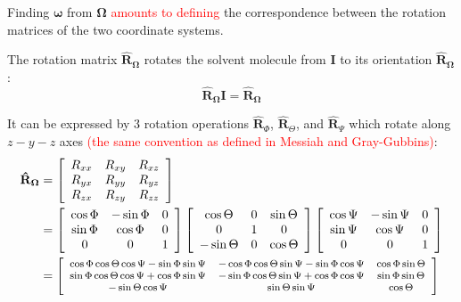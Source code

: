 %
Finding $\boldsymbol{\omega}$ from $\mathbf{\Omega}$ \textcolor{red}{amounts
to defining} the correspondence between the rotation matrices of the
two coordinate systems. 

The rotation matrix $\mathbf{\hat{R}}_{\mathbf{\Omega}}$ rotates
the solvent molecule from $\mathbf{I}$ to its orientation $\mathbf{\hat{R}}_{\mathbf{\Omega}}$:
\begin{equation}
\mathbf{\hat{R}}_{\mathbf{\Omega}}\mathbf{I}=\mathbf{\hat{R}}_{\mathbf{\Omega}}
\end{equation}

It can be expressed by 3 rotation operations $\mathbf{\hat{R}}_{\Phi}$,
$\mathbf{\hat{R}}_{\Theta}$, and $\mathbf{\hat{R}}_{\Psi}$ which
rotate along $z-y-z$ axes \textcolor{red}{(the same convention as
defined in Messiah and Gray-Gubbins)}:
\begin{align}
\mathbf{\hat{R}}_{\mathbf{\Omega}} & =\left[\begin{array}{ccc}
R_{xx} & R_{xy} & R_{xz}\\
R_{yx} & R_{yy} & R_{yz}\\
R_{zx} & R_{zy} & R_{zz}
\end{array}\right]\\
 & =\left[\begin{array}{ccc}
\cos\Phi & -\sin\Phi & 0\\
\sin\Phi & \cos\Phi & 0\\
0 & 0 & 1
\end{array}\right]\left[\begin{array}{ccc}
\cos\Theta & 0 & \sin\Theta\\
0 & 1 & 0\\
-\sin\Theta & 0 & \cos\Theta
\end{array}\right]\left[\begin{array}{ccc}
\cos\Psi & -\sin\Psi & 0\\
\sin\Psi & \cos\Psi & 0\\
0 & 0 & 1
\end{array}\right]\nonumber \\
 & =\footnotesize\left[\begin{array}{ccc}
\cos\Phi\cos\Theta\cos\Psi-\sin\Phi\sin\Psi & -\cos\Phi\cos\Theta\sin\Psi-\sin\Phi\cos\Psi & \cos\Phi\sin\Theta\\
\sin\Phi\cos\Theta\cos\Psi+\cos\Phi\sin\Psi & -\sin\Phi\cos\Theta\sin\Psi+\cos\Phi\cos\Psi & \sin\Phi\sin\Theta\\
-\sin\Theta\cos\Psi & \sin\Theta\sin\Psi & \cos\Theta
\end{array}\right]\nonumber 
\end{align}
